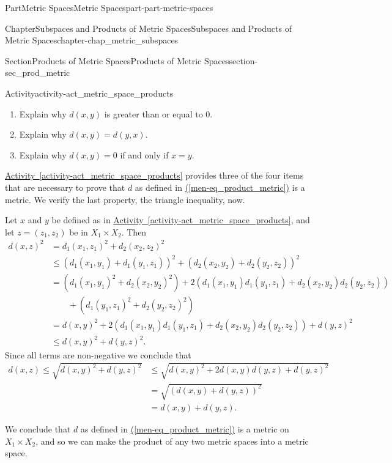 \documentclass[oneside,10pt,]{book}
\newcommand{\xreffont}{\relax}
\numberwithin{equation}{chapter}
\newcommand{\amp}{&}
\begin{document}
\begin{partptx}{Part}{Metric Spaces}{}{Metric Spaces}{}{}{part-part-metric-spaces}
\begin{chapterptx}{Chapter}{Subspaces and Products of Metric Spaces}{}{Subspaces and Products of Metric Spaces}{}{}{chapter-chap_metric_subspaces}
\begin{sectionptx}{Section}{Products of Metric Spaces}{}{Products of Metric Spaces}{}{}{section-sec_prod_metric}
\begin{activity}{Activity}{}{activity-act_metric_space_products}
\begin{enumerate}[font=\bfseries,label=(\alph*),ref=\alph*]%
\item{}Explain why \(d(x,y)\) is greater than or equal to \(0\).%
\item{}Explain why \(d(x,y) = d(y,x)\).%
\item{}Explain why \(d(x,y) = 0\) if and only if \(x = y\).%
\end{enumerate}%
\end{activity}%
\hyperref[activity-act_metric_space_products]{Activity~{\xreffont\ref{activity-act_metric_space_products}}} provides three of the four items that are necessary to prove that \(d\) as defined in \hyperref[men-eq_product_metric]{({\xreffont\ref{men-eq_product_metric}})} is a metric. We verify the last property, the triangle inequality, now.%
\par
Let \(x\) and \(y\) be defined as in \hyperref[activity-act_metric_space_products]{Activity~{\xreffont\ref{activity-act_metric_space_products}}}, and let \(z = (z_1, z_2)\) be in \(X_1 \times X_2\). Then%
\begin{align*}
d(x,z)^2 \amp =  d_1(x_1,z_1)^2 + d_2(x_2,z_2)^2 \\
\amp \leq \left(d_1(x_1,y_1) + d_1(y_1,z_1)\right)^2 + \left(d_2(x_2,y_2) + d_2(y_2,z_2)\right)^2 \\
\amp = \left(d_1(x_1,y_1)^2 + d_2(x_2,y_2)^2\right) + 2\left(d_1(x_1,y_1)d_1(y_1,z_1) + d_2(x_2,y_2)d_2(y_2,z_2) \right) \\
\amp \qquad + \left(d_1(y_1,z_1)^2 + d_2(y_2,z_2)^2\right)\\
\amp = d(x,y)^2 + 2\left(d_1(x_1,y_1)d_1(y_1,z_1) + d_2(x_2,y_2)d_2(y_2,z_2)\right) + d(y,z)^2 \\
\amp \leq d(x,y)^2 + d(y,z)^2\text{.}
\end{align*}
Since all terms are non-negative we conclude that%
\begin{align*}
d(x,z) \leq \sqrt{d(x,y)^2 + d(y,z)^2} \amp \leq \sqrt{d(x,y)^2 + 2 d(x,y)d(y,z) + d(y,z)^2} \\
\amp = \sqrt{\left(d(x,y)+d(y,z)\right)^2} \\
\amp = d(x,y) + d(y,z)\text{.}
\end{align*}
%
\par
We conclude that \(d\) as defined in \hyperref[men-eq_product_metric]{({\xreffont\ref{men-eq_product_metric}})} is a metric on \(X_1 \times X_2\), and so we can make the product of any two metric spaces into a metric space.%
\par

\end{sectionptx}
\end{chapterptx}
\end{partptx}
\end{document}
